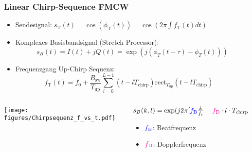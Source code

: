 \documentclass[16pt]{beamer}
\begin{document}
\begin{frame}

\end{frame}

\begin{frame}
\frametitle{Linear Chirp-Sequence FMCW}
	\begin{itemize}
		\item Sendesignal: $s_{\mathrm{T}}(t) = \cos(\phi_{\mathrm{T}}(t)) = \cos\left(2 \pi \int f_{\mathrm{T}}(t) dt\right)$ 
		\vspace{0.3cm}
		\item Komplexes Basisbandsignal (Stretch Processor): 
		$$s_{B}(t) = I(t) + jQ(t) = \exp(j(\phi_{T}(t - \tau) - \phi_{T}(t) ))$$
		\item Frequenzgang Up-Chirp Sequenz: 
		$$f_{\mathrm{T}}(t) = f_{\mathrm{0}} + \frac{B_{\mathrm{sw}}}{T_{\mathrm{up}}} \sum_{l=0}^{L-1}(t-lT_{\mathrm{chirp}}) \mathrm{rect}_{T_{\mathrm{up}}}(t-lT_{\mathrm{chirp}})\quad $$
	\end{itemize}
	\vspace{-0.4cm}
	\begin{columns}
		\begin{column}{6.7cm}
			\texttt{[image: figures/Chirpsequenz\_f\_vs\_t.pdf]}
		\end{column}
		\pause
		\begin{column}{5.5cm}
			\begin{footnotesize}
				$s_{B}(k,l) = \exp(j2\pi[\color{blue}{f_{\mathrm{B}}} \color{black} \frac{k}{f_{\mathrm{s}}} + \color{magenta}{f_{\mathrm{D}}} \color{black} \cdot l \cdot T_{\mathrm{chirp}} + \phi_{0}])$
				\begin{itemize}
					\item $\color{blue}{f_{\mathrm{B}}}$: Beatfrequenz
					\item $\color{magenta}{f_{\mathrm{D}}}$: Dopplerfrequenz
				\end{itemize}
			\end{footnotesize}
		\end{column}
	\end{columns}
\end{frame} 
\end{document}
